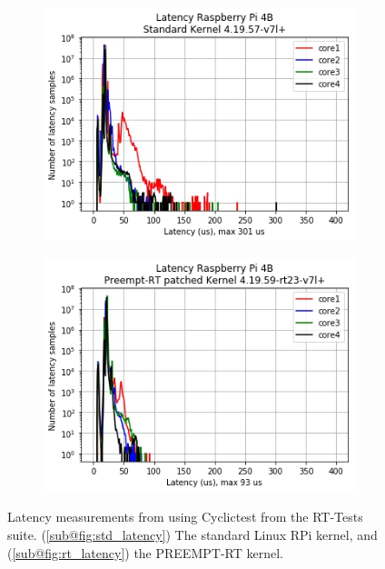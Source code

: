 \begin{figure}[H]
    \centering
    \begin{subfigure}{.49\textwidth}
        \centering
        \includegraphics[width=1\linewidth]{assets/lemariva-std-kernel-latency.png}
        \caption{}
        \label{fig:std_latency}
    \end{subfigure}
    \hfill
    \begin{subfigure}{.49\textwidth}
        \centering
        \includegraphics[width=1\linewidth]{assets/lemariva-rt-kernel-latency.png}
        \caption{}
        \label{fig:rt_latency}
    \end{subfigure}
    \caption{Latency measurements from \cite{maurorivaRaspberryPi4B2019} using Cyclictest from the RT-Tests suite. (\ref{sub@fig:std_latency}) The standard Linux RPi kernel, and (\ref{sub@fig:rt_latency}) the PREEMPT-RT kernel.}
    \label{fig:lemariva_latency}
\end{figure}

